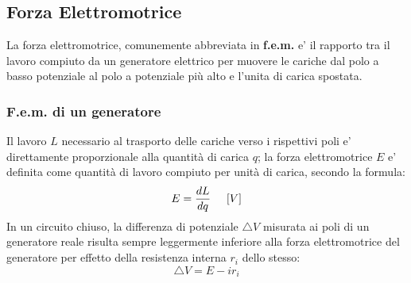 \documentclass[a4paper, 10pt]{article}
\begin{document}
		\subsection{Forza Elettromotrice}
			La forza elettromotrice, comunemente abbreviata in \textbf{f.e.m.} e' il rapporto tra il lavoro compiuto da un
			generatore elettrico per muovere le cariche dal polo a basso potenziale al polo a potenziale più alto 
			e l'unita di carica spostata.
			\subsubsection{F.e.m. di un generatore}
				Il lavoro $L$ necessario al trasporto delle cariche verso i rispettivi poli e' direttamente proporzionale
				alla quantità di carica $q$; la forza elettromotrice $E$ e' definita come quantità di lavoro compiuto per unità
				di carica, secondo la formula:
				\[ E = \frac{dL}{dq} \hspace{0.5cm} [V] \]
				In un circuito chiuso, la differenza di potenziale $\triangle V$ misurata ai poli di un generatore reale risulta 
				sempre leggermente inferiore alla forza elettromotrice del generatore per effetto della resistenza interna
				$r_i$ dello stesso:
				\[ \triangle V = E - i r_i \]
\end{document}
